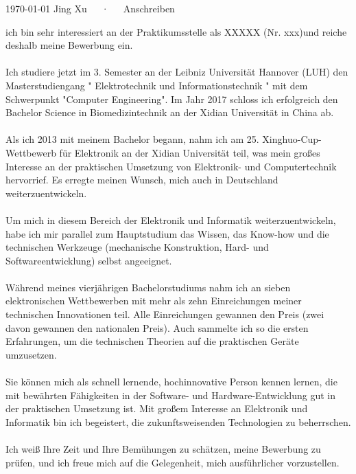 \documentclass[11pt, a4paper]{awesome-cv}
\providecommand{\applicatename}{XXXXX (Nr. xxx)}
\begin{document}
\makecvheader[R]

\makecvfooter
  {\today}
  {Jing Xu~~~·~~~Anschreiben}
  {}

\makelettertitle

\begin{cvletter}


ich bin sehr interessiert an der Praktikumsstelle als \applicatename und reiche deshalb meine Bewerbung ein.\\\\
Ich studiere jetzt im 3. Semester an der Leibniz Universität Hannover (LUH) den Masterstudiengang " Elektrotechnik und Informationstechnik " mit dem Schwerpunkt "Computer Engineering". Im Jahr 2017 schloss ich erfolgreich den Bachelor Science in Biomedizintechnik an der Xidian Universität in China ab.\\\\
Als ich 2013 mit meinem Bachelor begann, nahm ich am 25. Xinghuo-Cup-Wettbewerb für Elektronik an der Xidian Universität teil, was mein großes Interesse an der praktischen Umsetzung von Elektronik- und Computertechnik hervorrief. Es erregte meinen Wunsch, mich auch in Deutschland weiterzuentwickeln.\\\\
Um mich in diesem Bereich der Elektronik und Informatik weiterzuentwickeln, habe ich mir parallel zum Hauptstudium das Wissen, das Know-how und die technischen Werkzeuge (mechanische Konstruktion, Hard- und Softwareentwicklung) selbst angeeignet.\\\\
Während meines vierjährigen Bachelorstudiums nahm ich an sieben elektronischen Wettbewerben mit mehr als zehn Einreichungen meiner technischen Innovationen teil. Alle Einreichungen gewannen den Preis (zwei davon gewannen den nationalen Preis). Auch sammelte ich so die ersten Erfahrungen, um die technischen Theorien auf die praktischen Geräte umzusetzen.\\\\
Sie können mich als schnell lernende, hochinnovative Person kennen lernen, die mit bewährten Fähigkeiten in der Software- und Hardware-Entwicklung gut in der praktischen Umsetzung ist. Mit großem Interesse an Elektronik und Informatik bin ich begeistert, die zukunftsweisenden Technologien zu beherrschen.\\\\
Ich weiß Ihre Zeit und Ihre Bemühungen zu schätzen, meine Bewerbung zu prüfen, und ich freue mich auf die Gelegenheit, mich ausführlicher vorzustellen.\\\\



\end{cvletter}


\makeletterclosing
\end{document}
